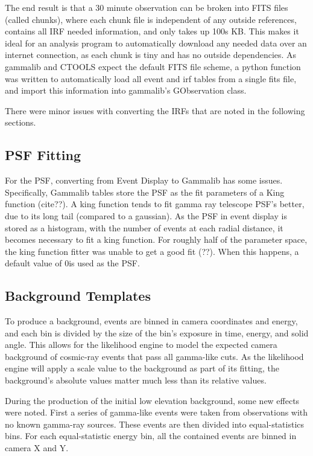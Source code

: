 The end result is that a 30 minute observation can be broken into  FITS files (called chunks), where each chunk file is independent of any outside references, contains all IRF needed information, and only takes up \nicetilde100s KB.
This makes it ideal for an analysis program to automatically download any needed data over an internet connection, as each chunk is tiny and has no outside dependencies.
As gammalib and CTOOLS expect the default FITS file scheme, a python function was written to automatically load all event and irf tables from a single fits file, and import this information into gammalib's GObservation class.

There were minor issues with converting the IRFs that are noted in the following sections.

\subsection{PSF Fitting}

For the PSF, converting from Event Display to Gammalib has some issues.
Specifically, Gammalib tables store the PSF as the fit parameters of a King function (cite??).
A king function tends to fit gamma ray telescope PSF's better, due to its long tail (compared to a gaussian).
As the PSF in event display is stored as a histogram, with the number of events at each radial distance, it becomes necessary to fit a king function.
For roughly half of the parameter space, the king function fitter was unable to get a good fit (??).
When this happens, a default value of 0\degree is used as the PSF.


\subsection{Background Templates}

To produce a background, events are binned in camera coordinates and energy, and each bin is divided by the size of the bin's exposure in time, energy, and solid angle.
This allows for the likelihood engine to model the expected camera background of cosmic-ray events that pass all gamma-like cuts.
As the likelihood engine will apply a scale value to the background as part of its fitting, the background's absolute values matter much less than its relative values.

During the production of the initial low elevation background, some new effects were noted.
First a series of gamma-like events were taken from observations with no known gamma-ray sources.
These events are then divided into equal-statistics bins.
For each equal-statistic energy bin, all the contained events are binned in camera X and Y.

